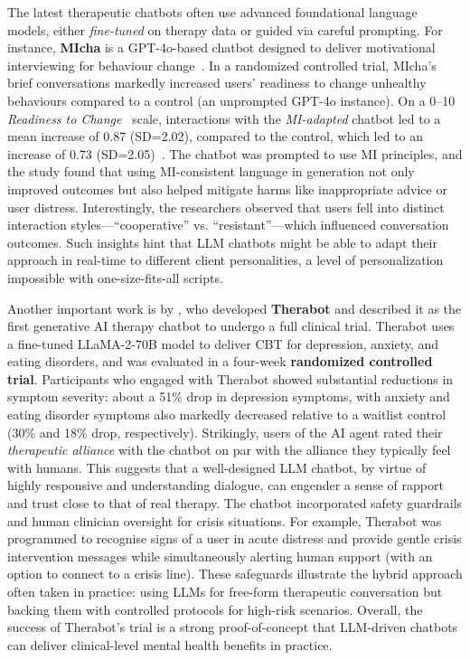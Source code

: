 The latest therapeutic chatbots often use advanced foundational language models, either \emph{fine-tuned} on therapy data or guided via careful prompting. For instance, \textbf{MIcha} is a GPT-4o-based chatbot designed to deliver motivational interviewing for behaviour change~\cite{Meyer2025}. In a randomized controlled trial, MIcha's brief conversations markedly increased users' readiness to change unhealthy behaviours compared to a control (an unprompted GPT-4o instance). On a 0--10 \emph{Readiness to Change}~\cite{BienerAbrams1991} scale, interactions with the \emph{MI-adapted} chatbot led to a mean increase of 0.87 (SD=2.02), compared to the control, which led to an increase of 0.73 (SD=2.05)~\cite{Meyer2025}.
The chatbot was prompted to use MI principles, and the study found that using MI-consistent language in generation not only improved outcomes but also helped mitigate harms like inappropriate advice or user distress. Interestingly, the researchers observed that users fell into distinct interaction styles---``cooperative'' vs. ``resistant''---which influenced conversation outcomes. Such insights hint that LLM chatbots might be able to adapt their approach in real-time to different client personalities, a level of personalization impossible with one-size-fits-all scripts.

Another important work is by \citet{doi:10.1056/AIoa2400802}, who developed \textbf{Therabot} and described it as the first generative AI therapy chatbot to undergo a full clinical trial. Therabot uses a fine-tuned LLaMA-2-70B model to deliver CBT for depression, anxiety, and eating disorders, and was evaluated in a four-week \textbf{randomized controlled trial}. Participants who engaged with Therabot showed substantial reductions in symptom severity: about a 51\% drop in depression symptoms, with anxiety and eating disorder symptoms also markedly decreased relative to a waitlist control (30\% and 18\% drop, respectively). Strikingly, users of the AI agent rated their \emph{therapeutic alliance} with the chatbot on par with the alliance they typically feel with humans. This suggests that a well-designed LLM chatbot, by virtue of highly responsive and understanding dialogue, can engender a sense of rapport and trust close to that of real therapy. The chatbot incorporated safety guardrails and human clinician oversight for crisis situations. For example, Therabot was programmed to recognise signs of a user in acute distress and provide gentle crisis intervention messages while simultaneously alerting human support (with an option to connect to a crisis line). These safeguards illustrate the hybrid approach often taken in practice: using LLMs for free-form therapeutic conversation but backing them with controlled protocols for high-risk scenarios. Overall, the success of Therabot's trial is a strong proof-of-concept that LLM-driven chatbots can deliver clinical-level mental health benefits in practice.

